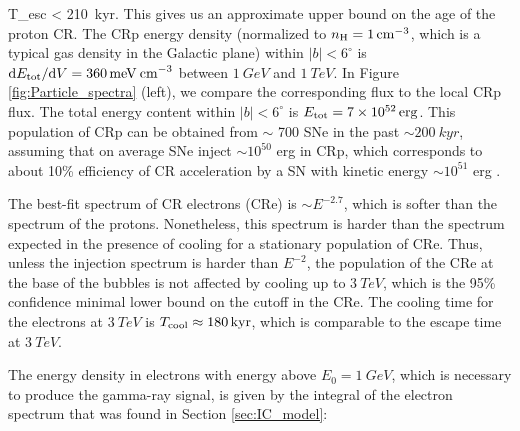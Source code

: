 \be
T_{\rm esc} <  \approx \SI{210}{kyr}.
\ee
This gives us an approximate upper bound on the age of the proton CR.
The CRp energy density (normalized to $n_{\text{H}} = \SI{1}{cm^{-3}}$, which is a typical gas density in the Galactic plane) 
within $|b| < 6^\circ$ is 
$\text{d} E_{\text{tot}} / \text{d} V = \SI{360}{meV\: cm^{-3}}$ between $\SI{1}{GeV}$ and $\SI{1}{TeV}$.
In Figure \ref{fig:Particle_spectra} (left), we compare the corresponding flux to the local CRp flux.
The total energy content within $|b| < 6^\circ$ is $E_{\text{tot}} = \SI{7e52}{erg}$.
This population of CRp can be obtained from $\sim$ 700 SNe in the past $\sim \SI{200}{kyr}$, 
assuming that on average SNe inject $\sim 10^{50}$ erg in CRp, which corresponds to about 10\% efficiency
of CR acceleration by a SN with kinetic energy $\sim 10^{51}$ erg \citep[e.g.,][]{Spurio2015}.

The best-fit spectrum of CR electrons (CRe) is $\sim E^{-2.7}$, which is softer than the spectrum of the protons.
Nonetheless, this spectrum is harder than the spectrum expected in the presence of cooling
for a stationary population of CRe.
Thus, unless the injection spectrum is harder than $E^{-2}$, the population of the CRe at the base of the 
bubbles is not affected by cooling up to $\SI{3}{TeV}$,
which is the 95\% confidence minimal lower bound on the cutoff in the CRe. 
The cooling time for the electrons at %
$\SI{3}{TeV}$ is $T_{\rm cool} \approx \SI{180}{kyr}$,
which is comparable to the escape time at $\SI{3}{TeV}$.

The energy density in electrons with energy above $E_0 = \SI{1}{GeV}$, which is necessary to produce the gamma-ray signal, 
is given by the integral of the electron spectrum that was found in Section \ref{sec:IC_model}:

